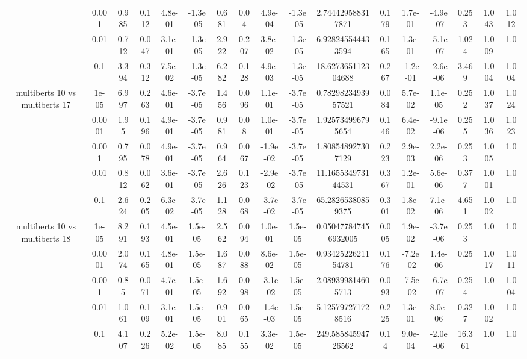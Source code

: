 \begin{tabular}{|c|c|c|c|c|c|c|c|c|c|c|c|c|c|c|c|c|}
 & 0.001 & 0.985 & 0.112 & 4.8e-01 & -1.3e-05 & 0.681 & 0.04 & 4.9e-04 & -1.3e-05 & 2.744429588317871 & 0.179 & 1.7e-01 & -4.9e-07 & 0.253 & 1.043 & 1.012 \\
 & 0.01 & 0.712 & 0.047 & 3.1e-01 & -1.3e-05 & 2.922 & 0.207 & 3.8e-02 & -1.3e-05 & 6.928245544433594 & 0.165 & 1.3e-01 & -5.1e-07 & 1.024 & 1.009 & 1.0 \\
 & 0.1 & 3.394 & 0.312 & 7.5e-02 & -1.3e-05 & 6.282 & 0.128 & 4.9e-03 & -1.3e-05 & 18.627365112304688 & 0.267 & -1.2e-01 & -2.6e-06 & 3.469 & 1.004 & 1.004 \\
\hline
\multirow{5}{*}{multiberts 10 vs multiberts 17} & 1e-05 & 6.997 & 0.263 & 4.6e-01 & -3.7e-05 & 1.456 & 0.096 & 1.1e-01 & -3.7e-05 & 0.7829823493957521 & 0.084 & 5.7e-02 & 1.1e-05 & 0.252 & 1.037 & 1.024 \\
 & 0.0001 & 1.95 & 0.196 & 4.9e-01 & -3.7e-05 & 0.981 & 0.08 & 1.0e-01 & -3.7e-05 & 1.925734996795654 & 0.146 & 6.4e-02 & -9.1e-06 & 0.255 & 1.036 & 1.023 \\
 & 0.001 & 0.795 & 0.078 & 4.9e-01 & -3.7e-05 & 0.964 & 0.067 & -1.9e-02 & -3.7e-05 & 1.808548927307129 & 0.223 & 2.9e-03 & 2.2e-06 & 0.253 & 1.005 & 1.0 \\
 & 0.01 & 0.812 & 0.062 & 3.6e-01 & -3.7e-05 & 2.626 & 0.123 & -2.9e-02 & -3.7e-05 & 11.165534973144531 & 0.367 & 1.2e-01 & 5.6e-06 & 0.377 & 1.001 & 1.0 \\
 & 0.1 & 2.624 & 0.205 & 6.3e-02 & -3.7e-05 & 1.128 & 0.068 & -3.7e-02 & -3.7e-05 & 65.28265380859375 & 0.301 & 1.8e-02 & 7.1e-06 & 4.651 & 1.002 & 1.0 \\
\hline
\multirow{5}{*}{multiberts 10 vs multiberts 18} & 1e-05 & 8.291 & 0.193 & 4.5e-01 & 1.5e-05 & 2.562 & 0.094 & 1.0e-01 & 1.5e-05 & 0.050477847456932005 & 0.005 & 1.9e-02 & -3.7e-06 & 0.253 & 1.0 & 1.0 \\
 & 0.0001 & 2.074 & 0.165 & 4.8e-01 & 1.5e-05 & 1.687 & 0.088 & 8.6e-02 & 1.5e-05 & 0.9342522621154781 & 0.176 & -7.2e-02 & 1.4e-06 & 0.25 & 1.017 & 1.011 \\
 & 0.001 & 0.85 & 0.071 & 4.7e-01 & 1.5e-05 & 1.692 & 0.098 & -3.1e-02 & 1.5e-05 & 2.089399814605713 & 0.093 & -7.5e-02 & -6.7e-07 & 0.254 & 1.0 & 1.004 \\
 & 0.01 & 1.061 & 0.109 & 3.1e-01 & 1.5e-05 & 0.901 & 0.065 & -1.4e-03 & 1.5e-05 & 5.125797271728516 & 0.225 & 1.3e-01 & 8.0e-06 & 0.327 & 1.002 & 1.0 \\
 & 0.1 & 4.107 & 0.226 & 5.2e-02 & 1.5e-05 & 8.085 & 0.155 & 3.3e-02 & 1.5e-05 & 249.58584594726562 & 0.14 & 9.0e-04 & -2.0e-06 & 16.361 & 1.0 & 1.0 \\

\end{tabular}
